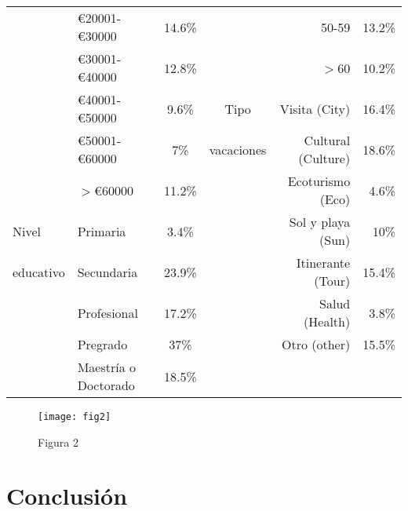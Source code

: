 \documentclass[12pt]{beamer}
\begin{document}
\begin{flushleft}
\begin{tabular*}{0.978\textwidth}{ |l  l  c  c  r  r |}
		 {\tiny } & {\scriptsize \euro20001-\euro30000} & {\scriptsize 14.6\%} & {\scriptsize } & {\scriptsize 50-59} & {\scriptsize 13.2\%} \\
		 {\tiny } & {\scriptsize \euro30001-\euro40000} & {\scriptsize 12.8\%} & {\scriptsize } & {\scriptsize $>$60} & {\scriptsize 10.2\%}
		 \\ {\tiny } & {\scriptsize \euro40001-\euro50000} & {\scriptsize 9.6\%} & {\scriptsize Tipo} & {\tiny Visita (City)} & {\scriptsize 16.4\%}\\
		 {\tiny } & {\scriptsize \euro50001-\euro60000} & {\scriptsize 7\%} & {\scriptsize vacaciones} & {\tiny Cultural (Culture)} & {\scriptsize 18.6\%} \\
		 {\tiny } & {\scriptsize $>$\euro60000} & {\scriptsize 11.2\%} & {\scriptsize} & {\tiny Ecoturismo (Eco)} & {\scriptsize 4.6\%}\\
		 {\scriptsize Nivel} & {\tiny Primaria} & {\scriptsize 3.4\%}
		   & {\scriptsize } & {\tiny Sol y playa (Sun)} & {\scriptsize 10\%}	\\
		   {\scriptsize educativo} & {\tiny Secundaria} & {\scriptsize 23.9\%}
		  & {\scriptsize } &{\tiny Itinerante (Tour)} & {\scriptsize 15.4\%}	\\
		  {\scriptsize } & {\tiny Profesional} & {\scriptsize 17.2\%} & {\scriptsize } & {\tiny Salud (Health)} & {\scriptsize 3.8\%} 	\\
		  {\scriptsize } & {\tiny Pregrado} & {\scriptsize 37\%}
		  &  {\scriptsize } & {\tiny Otro (other)} & {\scriptsize 15.5\%} 	\\	
		  {\scriptsize } & {\tiny Maestría o Doctorado} & {\scriptsize 18.5\%}
		   &  &  & 	\\	
		\hline 
	\end{tabular*}
\end{flushleft}

\begin{figure}[htb]
	\centering
	\texttt{[image: fig2]}
	\caption{Figura 2}
\end{figure}
\section{Conclusión}
\begin{center}
	
\end{center}
	
\end{document}
